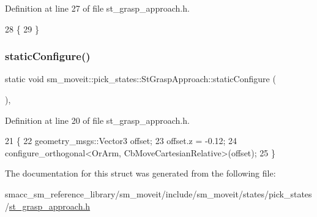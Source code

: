 Definition at line 27 of file st\+\_\+grasp\+\_\+approach.\+h.


\begin{DoxyCode}
28     \{
29     \}
\end{DoxyCode}
\mbox{\label{structsm__moveit_1_1pick__states_1_1StGraspApproach_a66e75bd4670e13898394a2b27b771a98}} 
\subsubsection{\texorpdfstring{static\+Configure()}{staticConfigure()}}
{\footnotesize\ttfamily static void sm\+\_\+moveit\+::pick\+\_\+states\+::\+St\+Grasp\+Approach\+::static\+Configure (\begin{DoxyParamCaption}{ }\end{DoxyParamCaption})\hspace{0.3cm}{\ttfamily [inline]}, {\ttfamily [static]}}



Definition at line 20 of file st\+\_\+grasp\+\_\+approach.\+h.


\begin{DoxyCode}
21     \{
22         geometry\_msgs::Vector3 offset;
23         offset.z = -0.12;
24         configure\_orthogonal<OrArm, CbMoveCartesianRelative>(offset);
25     \}
\end{DoxyCode}


The documentation for this struct was generated from the following file\+:\begin{DoxyCompactItemize}
\item 
smacc\+\_\+sm\+\_\+reference\+\_\+library/sm\+\_\+moveit/include/sm\+\_\+moveit/states/pick\+\_\+states/\hyperlink{sm__moveit_2include_2sm__moveit_2states_2pick__states_2st__grasp__approach_8h}{st\+\_\+grasp\+\_\+approach.\+h}\end{DoxyCompactItemize}
